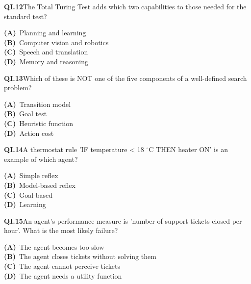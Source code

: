 \begin{tcolorbox}[enhanced,breakable,colback=white,colframe=navyL,arc=2mm,boxrule=0.7pt,left=3mm,right=3mm,top=2mm,bottom=2mm]
\textbf{\color{navy}QI.12}\quad The Total Turing Test adds which two capabilities to those needed for the standard test?\hfill{}\par\smallskip
{\small \textbf{\color{navyL}(A)}\ Planning and learning\\[1pt]\textbf{\color{navyL}(B)}\ Computer vision and robotics\\[1pt]\textbf{\color{navyL}(C)}\ Speech and translation\\[1pt]\textbf{\color{navyL}(D)}\ Memory and reasoning}
\end{tcolorbox}
\begin{tcolorbox}[enhanced,breakable,colback=white,colframe=navyL,arc=2mm,boxrule=0.7pt,left=3mm,right=3mm,top=2mm,bottom=2mm]
\textbf{\color{navy}QI.13}\quad Which of these is NOT one of the five components of a well-defined search problem?\hfill{}\par\smallskip
{\small \textbf{\color{navyL}(A)}\ Transition model\\[1pt]\textbf{\color{navyL}(B)}\ Goal test\\[1pt]\textbf{\color{navyL}(C)}\ Heuristic function\\[1pt]\textbf{\color{navyL}(D)}\ Action cost}
\end{tcolorbox}
\begin{tcolorbox}[enhanced,breakable,colback=white,colframe=navyL,arc=2mm,boxrule=0.7pt,left=3mm,right=3mm,top=2mm,bottom=2mm]
\textbf{\color{navy}QI.14}\quad A thermostat rule 'IF temperature < 18 $^\circ$C THEN heater ON' is an example of which agent?\hfill{}\par\smallskip
{\small \textbf{\color{navyL}(A)}\ Simple reflex\\[1pt]\textbf{\color{navyL}(B)}\ Model-based reflex\\[1pt]\textbf{\color{navyL}(C)}\ Goal-based\\[1pt]\textbf{\color{navyL}(D)}\ Learning}
\end{tcolorbox}
\begin{tcolorbox}[enhanced,breakable,colback=white,colframe=navyL,arc=2mm,boxrule=0.7pt,left=3mm,right=3mm,top=2mm,bottom=2mm]
\textbf{\color{navy}QI.15}\quad An agent's performance measure is 'number of support tickets closed per hour'. What is the most likely failure?\hfill{}\par\smallskip
{\small \textbf{\color{navyL}(A)}\ The agent becomes too slow\\[1pt]\textbf{\color{navyL}(B)}\ The agent closes tickets without solving them\\[1pt]\textbf{\color{navyL}(C)}\ The agent cannot perceive tickets\\[1pt]\textbf{\color{navyL}(D)}\ The agent needs a utility function}
\end{tcolorbox}
\newpage
